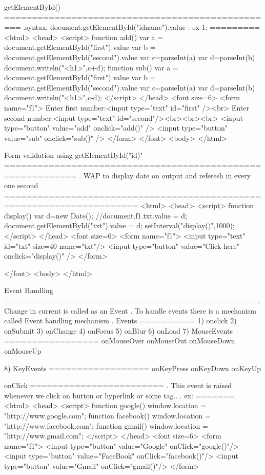 getElementById()
=================================================
.syntax: document.getElementById("idname").value
. ex-1:
=========
<html>
    <head>
	   <script>
	      function add()
		  {
				var a = document.getElementById("first").value
				var b = document.getElementById("second").value
				var c=parseInt(a)
				var d=parseInt(b)
				document.writeln("<h1>",c+d);
		  }
		  function sub()
		  {
				var a = document.getElementById("first").value
				var b = document.getElementById("second").value
				var c=parseInt(a)
				var d=parseInt(b)
				document.writeln("<h1>",c-d);
		  }
	   </script>
	</head>
    <font size=6>
     <form name="f1">
	  Enter first number:<input type="text" id="first" /><br>
	  Enter second number:<input type="text" id="second"/><br><br><br>
	  <input type="button" value="add" onclick="add()" />
	  <input type="button" value="sub" onclick="sub()" />
	 </form>
   </font>
  <body>
</html>

Form validation using getElementById("id)"
===========================================================
. WAP to display date on output and referesh in every one second
======================================================================
<html>
    <head>
	   <script>
	     function display()
		 {
			 var d=new Date();
			 //document.f1.txt.value = d;
			 document.getElementById("txt").value = d;
		 }
		 setInterval("display()",1000);
	   </script>
	</head>
    <font size=6>
     <form name="f1">
	    <input type="text" id="txt" size=40 name="txt"/>
		<input type="button" value="Click here" onclick="display()" />
	 </form>
	
   </font>
  <body>
</html>

Event Handling
=============================================
. Change in current is called as an Event
. To handle events there is a mechanism called Event handling mechanism
. Events
==========
 1) onclick
 2) onSubmit
 3) onChange
 4) onFocus
 5) onBlur
 6) onLoad
 7) MouseEvents
  =================
     onMouseOver
     onMouseOut
     onMouseDown
     onMouseUp

 8) KeyEvents
 ==================
     onKeyPress
     onKeyDown
     onKeyUp

onClick
========================
. This event is raised whenever we click on button or hyperlink or some tag..
. ex:
=======
<html>
    <head>
	   <script>
	     function google()
		 {
			 window.location = "http://www.google.com";
		 }
		 function facebook()
		 {
			 window.location = "http://www.facebook.com";
		 }
		 function gmail()
		 {
			 window.location = "http://www.gmail.com";
		 }
	   </script>
	</head>
    <font size=6>
     <form name="f1">
	    <input type="button" value="Google" onClick="google()"/>
		<input type="button" value="FaceBook" onClick="facebook()"/>
		<input type="button" value="Gmail" onClick="gmail()"/>
	 </form>
	
